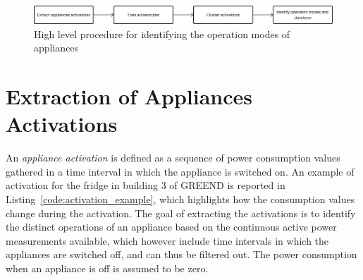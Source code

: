 \begin{figure}
  \centering
  \includegraphics[width=\linewidth]{images/modes_clustering/high_level_procedure.png}
  \caption{High level procedure for identifying the operation modes of appliances}
  \label{fig:high_level_procedure}
\end{figure}

\section{Extraction of Appliances Activations}

An \textit{appliance activation} is defined as a sequence of power consumption values gathered in a time interval in which the appliance is switched on. An example of activation for the fridge in building 3 of GREEND is reported in Listing~\ref{code:activation_example}, which highlights how the consumption values change during the activation. The goal of extracting the activations is to identify the distinct operations of an appliance based on the continuous active power measurements available, which however include time intervals in which the appliances are switched off, and can thus be filtered out. The power consumption when an appliance is off is assumed to be zero.

